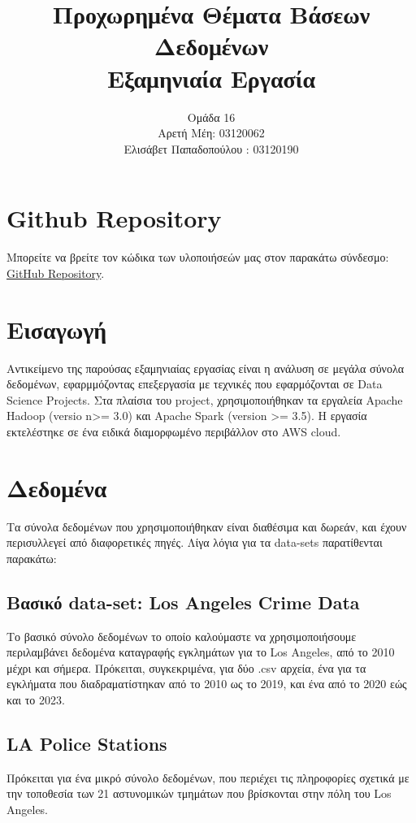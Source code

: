 \documentclass{article}
\begin{document}
\title{Προχωρημένα Θέματα Βάσεων Δεδομένων \\ Εξαμηνιαία Εργασία}
\date{}
\author{ 
\large Ομάδα 16 \\
Αρετή Μέη: 03120062 \\ 
Ελισάβετ Παπαδοπούλου : 03120190
}
\maketitle 
\pagebreak

\section*{ Github Repository } 
Μπορείτε να βρείτε τον κώδικα των υλοποιήσεών μας στον παρακάτω σύνδεσμο: \\
\href{https://github.com/ntua-el20062/Advanced_Databases.git}{GitHub Repository}.

\section{ Εισαγωγή }
Αντικείμενο της παρούσας εξαμηνιαίας εργασίας είναι η ανάλυση σε μεγάλα σύνολα δεδομένων, εφαρμμόζοντας επεξεργασία με τεχνικές που εφαρμόζονται σε Data Science Projects. Στα πλαίσια του project, χρησιμοποιήθηκαν τα εργαλεία Apache Hadoop (versio n>= 3.0) και Apache Spark (version >= 3.5). Η εργασία εκτελέστηκε σε ένα ειδικά διαμορφωμένο περιβάλλον στο AWS cloud. 

\section{ Δεδομένα }
Τα σύνολα δεδομένων που χρησιμοποιήθηκαν είναι διαθέσιμα και δωρεάν, και έχουν περισυλλεγεί από διαφορετικές πηγές. Λίγα λόγια για τα data-sets παρατίθενται παρακάτω: 

\subsection{ Βασικό data-set: Los Angeles Crime Data }
Το βασικό σύνολο δεδομένων το οποίο καλούμαστε να χρησιμοποιήσουμε περιλαμβάνει δεδομένα καταγραφής εγκλημάτων για το Los Angeles, από το 2010 μέχρι και σήμερα. Πρόκειται, συγκεκριμένα, για δύο .csv αρχεία, ένα για τα εγκλήματα που διαδραματίστηκαν από το 2010 ως το 2019, και ένα από το 2020 εώς και το 2023. 

\subsection{ LA Police Stations } 
Πρόκειται για ένα μικρό σύνολο δεδομένων, που περιέχει τις πληροφορίες σχετικά με την τοποθεσία των 21 αστυνομικών τμημάτων που βρίσκονται στην πόλη του Los Angeles. 
\end{document}
